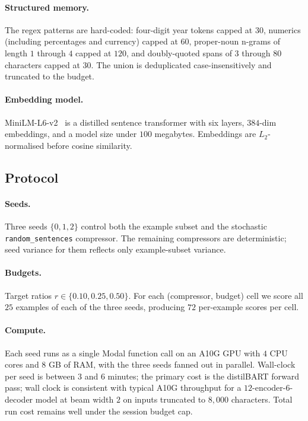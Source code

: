 \documentclass[11pt]{article}
\begin{document}
\paragraph{Structured memory.}
The regex patterns are hard-coded: four-digit year tokens capped at
$30$, numerics (including percentages and currency) capped at $60$,
proper-noun n-grams of length $1$ through $4$ capped at $120$, and
doubly-quoted spans of $3$ through $80$ characters capped at $30$. The
union is deduplicated case-insensitively and truncated to the budget.

\paragraph{Embedding model.}
MiniLM-L6-v2~\citep{reimers2019sentencebert} is a distilled sentence
transformer with six layers, $384$-dim embeddings, and a model size
under $100$ megabytes. Embeddings are $L_2$-normalised before cosine
similarity.

\subsection{Protocol}
\label{sec:exp-protocol}

\paragraph{Seeds.}
Three seeds $\{0, 1, 2\}$ control both the example subset and the
stochastic \texttt{random\_sentences} compressor. The remaining
compressors are deterministic; seed variance for them reflects only
example-subset variance.

\paragraph{Budgets.}
Target ratios $r \in \{0.10, 0.25, 0.50\}$. For each
(compressor, budget) cell we score all $25$ examples of each of the
three seeds, producing $72$ per-example scores per cell.

\paragraph{Compute.}
Each seed runs as a single Modal function call on an A10G GPU with
$4$ CPU cores and $8$ GB of RAM, with the three seeds fanned out in
parallel. Wall-clock per seed is between $3$ and $6$ minutes; the
primary cost is the distilBART forward pass; wall clock is consistent with typical A10G throughput for a $12$-encoder-$6$-decoder model at beam width $2$ on inputs truncated to $8{,}000$ characters. Total run cost
remains well under the session budget cap.
\end{document}
